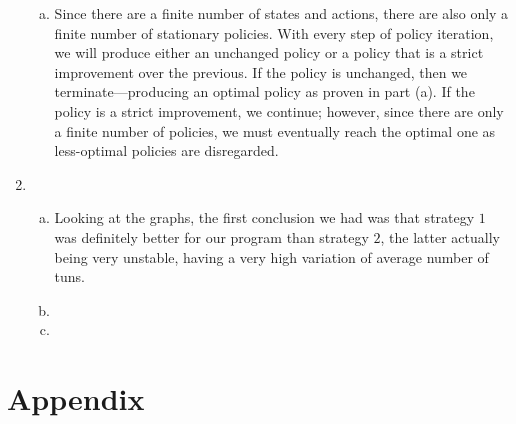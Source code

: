 \documentclass{article}
\begin{document}
\begin{enumerate}
\begin{enumerate}[(a)]
                \item Since there are a finite number of states and actions, there are also only a finite number of stationary policies. With every step of policy iteration, we will produce either an unchanged policy or a policy that is a strict improvement over the previous. If the policy is unchanged, then we terminate---producing an optimal policy as proven in part (a). If the policy is a strict improvement, we continue; however, since there are only a finite number of policies, we must eventually reach the optimal one as less-optimal policies are disregarded.
            \end{enumerate}        
        \item
            \begin{enumerate}[(a)]
                \item %

                Looking at the graphs, the first conclusion we had was that strategy $1$ was definitely better for our program than strategy $2$, the latter actually being very unstable, having a very high variation of average number of tuns. 
                \item %
                \item %
            \end{enumerate}                
    \end{enumerate}

\newpage
\section*{Appendix}
\end{document}

